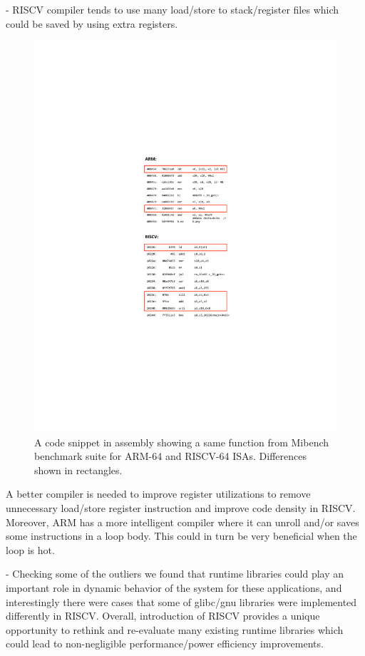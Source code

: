 - RISCV compiler tends to use many load/store to stack/register files which could be saved by using extra registers. 
\begin{figure}[H]
	\centering
	\includegraphics[width=0.7\columnwidth]{figures/code.pdf}
	\caption{A code snippet in assembly showing a same function from Mibench benchmark suite for ARM-64 and RISCV-64 ISAs. Differences shown in rectangles.}
	\label{fig:code}
\end{figure} 



A better compiler is needed to improve register utilizations to remove unnecessary load/store register instruction and improve code density in RISCV. 
Moreover, ARM has a more intelligent compiler where it can unroll and/or saves some instructions in a loop body. This could in turn be very beneficial when the loop is hot. 



- Checking some of the outliers we found that runtime libraries could play an important role in dynamic behavior of the system for these applications, and interestingly there were cases that some of glibc/gnu libraries were implemented differently in RISCV. Overall, introduction of RISCV provides a unique opportunity to rethink and re-evaluate many existing runtime libraries which could lead to non-negligible performance/power efficiency improvements. 


